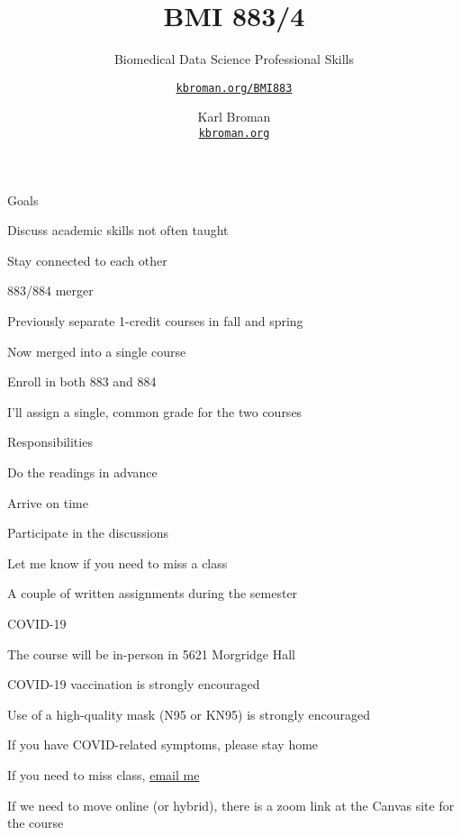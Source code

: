 \documentclass[aspectratio=169,12pt,t]{beamer}
\title{BMI 883/4}
\subtitle{Biomedical Data Science Professional Skills}
\author{\href{https://kbroman.org/BMI883}{\tt kbroman.org/BMI883} }
\institute{}
\date{\small \hspace{3in} Karl Broman \\
  \hspace{3in} \href{https://kbroman.org}{\color{foreground}
    \small \tt kbroman.org}}
\begin{document}
{
\frame{
  \titlepage
} }




\begin{frame}{Goals}

  \bbi
\item Discuss academic skills not often taught
\item Stay connected to each other
  \ei

\end{frame}




\begin{frame}{883/884 merger}

  \bbi
\item Previously separate 1-credit courses in fall and spring
\item Now merged into a single course
\item Enroll in both 883 and 884
\item I'll assign a single, common grade for the two courses
  \ei

\end{frame}




\begin{frame}{Responsibilities}

  \bbi
\item Do the readings in advance
\item Arrive on time
\item Participate in the discussions
\item Let me know if you need to miss a class
\item A couple of written assignments during the semester
  \ei

\end{frame}



\begin{frame}{COVID-19}

  \bbi
\item The course will be in-person in 5621 Morgridge Hall
\item COVID-19 vaccination is strongly encouraged
\item Use of a high-quality mask (N95 or KN95) is strongly encouraged
\item If you have COVID-related symptoms, please stay home
\item If you need to miss class, \href{mailto:broman@wisc.edu}{email me}
\item If we need to move online (or hybrid), there is a zoom link at
  the Canvas site for the course
  \ei

\end{frame}
\end{document}
